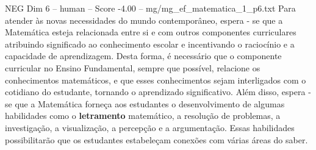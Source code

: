 \begin{textsample}{NEG Dim 6 – human – Score -4.00 – mg/mg\_ef\_matematica\_1\_p6.txt}  \label{ex:f6_neg_001}
Para atender às novas necessidades do mundo contemporâneo, espera - se que a Matemática esteja relacionada entre si e com outros componentes curriculares atribuindo significado ao conhecimento escolar e incentivando o raciocínio e a capacidade de aprendizagem.
Desta forma, é necessário que o componente curricular no Ensino Fundamental, sempre que possível, relacione os conhecimentos matemáticos, e que esses conhecimentos sejam interligados com o cotidiano do estudante, tornando o aprendizado significativo.
Além disso, espera -se que a Matemática forneça aos estudantes o desenvolvimento de algumas habilidades como o \textbf{letramento} matemático, a resolução de problemas, a investigação, a visualização, a percepção e a argumentação.
Essas habilidades possibilitarão que os estudantes estabeleçam conexões com várias áreas do saber.

\end{textsample}
